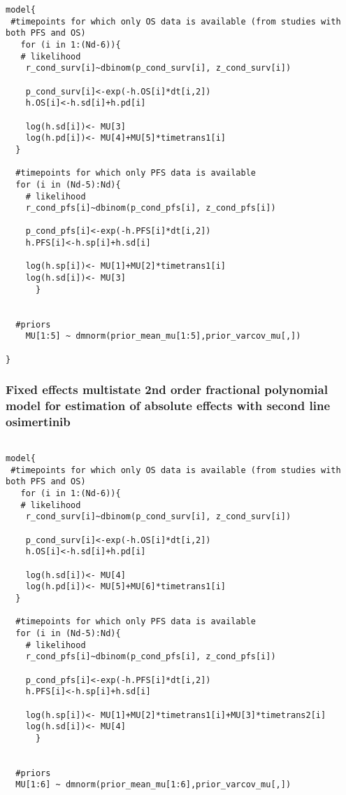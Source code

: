 \documentclass[11pt,final,fleqn]{article}\usepackage[]{graphicx}\usepackage[]{color}
\theoremstyle{plain}
\begin{document}
\begin{appendices}
\begin{verbatim}
model{
 #timepoints for which only OS data is available (from studies with both PFS and OS)
   for (i in 1:(Nd-6)){
   # likelihood
    r_cond_surv[i]~dbinom(p_cond_surv[i], z_cond_surv[i]) 
    
    p_cond_surv[i]<-exp(-h.OS[i]*dt[i,2])
    h.OS[i]<-h.sd[i]+h.pd[i]
    
    log(h.sd[i])<- MU[3] 
    log(h.pd[i])<- MU[4]+MU[5]*timetrans1[i]
  }
    
  #timepoints for which only PFS data is available 
  for (i in (Nd-5):Nd){
    # likelihood
    r_cond_pfs[i]~dbinom(p_cond_pfs[i], z_cond_pfs[i]) 
    
    p_cond_pfs[i]<-exp(-h.PFS[i]*dt[i,2])
    h.PFS[i]<-h.sp[i]+h.sd[i]
    
    log(h.sp[i])<- MU[1]+MU[2]*timetrans1[i]
    log(h.sd[i])<- MU[3] 
      }
  
  
  #priors
    MU[1:5] ~ dmnorm(prior_mean_mu[1:5],prior_varcov_mu[,]) 
  
}

\end{verbatim}

\subsubsection{Fixed effects multistate 2nd order fractional polynomial model for estimation of absolute effects with second line osimertinib} 
\begin{verbatim} 

model{
 #timepoints for which only OS data is available (from studies with both PFS and OS)
   for (i in 1:(Nd-6)){
   # likelihood
    r_cond_surv[i]~dbinom(p_cond_surv[i], z_cond_surv[i]) 
    
    p_cond_surv[i]<-exp(-h.OS[i]*dt[i,2])
    h.OS[i]<-h.sd[i]+h.pd[i]
    
    log(h.sd[i])<- MU[4] 
    log(h.pd[i])<- MU[5]+MU[6]*timetrans1[i]
  }
    
  #timepoints for which only PFS data is available 
  for (i in (Nd-5):Nd){
    # likelihood
    r_cond_pfs[i]~dbinom(p_cond_pfs[i], z_cond_pfs[i]) 
    
    p_cond_pfs[i]<-exp(-h.PFS[i]*dt[i,2])
    h.PFS[i]<-h.sp[i]+h.sd[i]
    
    log(h.sp[i])<- MU[1]+MU[2]*timetrans1[i]+MU[3]*timetrans2[i] 
    log(h.sd[i])<- MU[4] 
      }
  
 
  #priors
  MU[1:6] ~ dmnorm(prior_mean_mu[1:6],prior_varcov_mu[,]) 
  

\end{verbatim}
\end{appendices}
\end{document}
